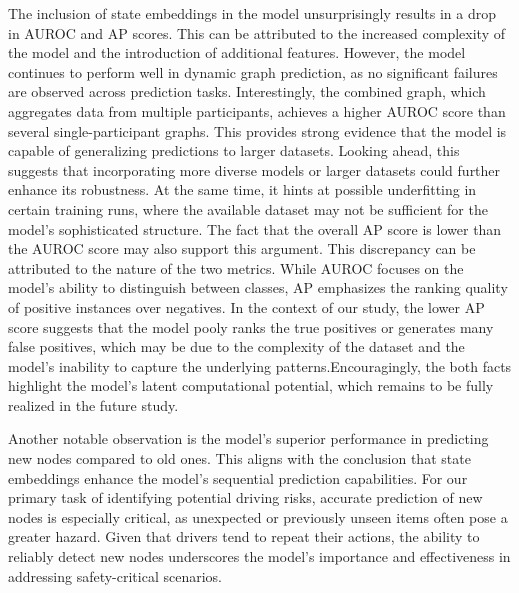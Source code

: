 The inclusion of state embeddings in the model unsurprisingly results in a drop in AUROC and AP scores. This can be attributed to the increased complexity of the model and the introduction of additional features. However, the model continues to perform well in dynamic graph prediction, as no significant failures are observed across prediction tasks. Interestingly, the combined graph, which aggregates data from multiple participants, achieves a higher AUROC score than several single-participant graphs. This provides strong evidence that the model is capable of generalizing predictions to larger datasets. Looking ahead, this suggests that incorporating more diverse models or larger datasets could further enhance its robustness. At the same time, it hints at possible underfitting in certain training runs, where the available dataset may not be sufficient for the model’s sophisticated structure. The fact that the overall AP score is lower than the AUROC score may also support this argument. This discrepancy can be attributed to the nature of the two metrics. While AUROC focuses on the model's ability to distinguish between classes, AP emphasizes the ranking quality of positive instances over negatives. In the context of our study, the lower AP score suggests that the model pooly ranks the true positives or generates many false positives, which may be due to the complexity of the dataset and the model's inability to capture the underlying patterns.Encouragingly, the both facts highlight the model’s latent computational potential, which remains to be fully realized in the future study.

Another notable observation is the model’s superior performance in predicting new nodes compared to old ones. This aligns with the conclusion that state embeddings enhance the model’s sequential prediction capabilities. For our primary task of identifying potential driving risks, accurate prediction of new nodes is especially critical, as unexpected or previously unseen items often pose a greater hazard. Given that drivers tend to repeat their actions, the ability to reliably detect new nodes underscores the model’s importance and effectiveness in addressing safety-critical scenarios.

